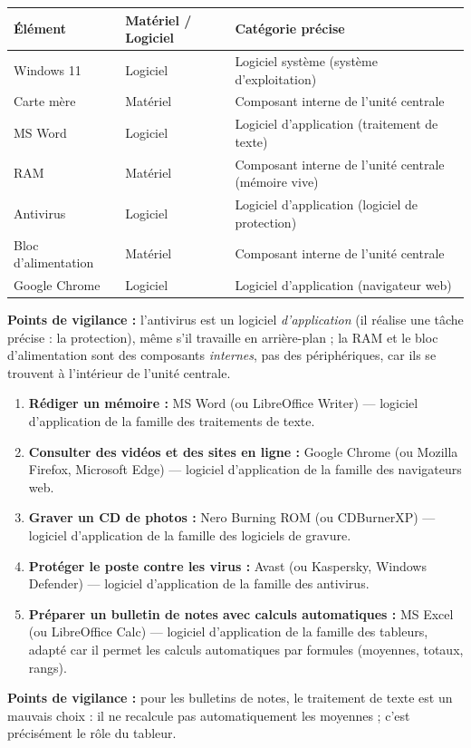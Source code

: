 \documentclass[11pt]{article}
\newcommand{\cle}[1]{{\popxbold\color{popdark}#1}}
\begin{document}
\begin{corrige}
\begin{center}
\begin{tabularx}{\linewidth}{|l|X|X|}
\hline
\rowcolor{popblueL} \textbf{Élément} & \textbf{Matériel / Logiciel} & \textbf{Catégorie précise} \\
\hline
Windows 11 & Logiciel & Logiciel système (système d'exploitation) \\
\hline
Carte mère & Matériel & Composant interne de l'unité centrale \\
\hline
MS Word & Logiciel & Logiciel d'application (traitement de texte) \\
\hline
RAM & Matériel & Composant interne de l'unité centrale (mémoire vive) \\
\hline
Antivirus & Logiciel & Logiciel d'application (logiciel de protection) \\
\hline
Bloc d'alimentation & Matériel & Composant interne de l'unité centrale \\
\hline
Google Chrome & Logiciel & Logiciel d'application (navigateur web) \\
\hline
\end{tabularx}
\end{center}
\textbf{Points de vigilance :} l'antivirus est un logiciel \emph{d'application} (il réalise une tâche précise : la protection), même s'il travaille en arrière-plan ; la RAM et le bloc d'alimentation sont des composants \emph{internes}, pas des périphériques, car ils se trouvent à l'intérieur de l'unité centrale.
\end{corrige}

\begin{corrige}
\begin{enumerate}
\item \textbf{Rédiger un mémoire :} MS Word (ou LibreOffice Writer) — logiciel d'application de la famille des \cle{traitements de texte}.
\item \textbf{Consulter des vidéos et des sites en ligne :} Google Chrome (ou Mozilla Firefox, Microsoft Edge) — logiciel d'application de la famille des \cle{navigateurs web}.
\item \textbf{Graver un CD de photos :} Nero Burning ROM (ou CDBurnerXP) — logiciel d'application de la famille des \cle{logiciels de gravure}.
\item \textbf{Protéger le poste contre les virus :} Avast (ou Kaspersky, Windows Defender) — logiciel d'application de la famille des \cle{antivirus}.
\item \textbf{Préparer un bulletin de notes avec calculs automatiques :} MS Excel (ou LibreOffice Calc) — logiciel d'application de la famille des \cle{tableurs}, adapté car il permet les calculs automatiques par formules (moyennes, totaux, rangs).
\end{enumerate}
\textbf{Points de vigilance :} pour les bulletins de notes, le traitement de texte est un mauvais choix : il ne recalcule pas automatiquement les moyennes ; c'est précisément le rôle du tableur.
\end{corrige}
\end{document}
